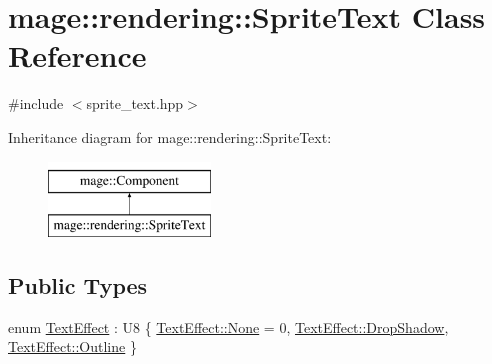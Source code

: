\hypertarget{classmage_1_1rendering_1_1_sprite_text}{}\section{mage\+:\+:rendering\+:\+:Sprite\+Text Class Reference}
\label{classmage_1_1rendering_1_1_sprite_text}


{\ttfamily \#include $<$sprite\+\_\+text.\+hpp$>$}

Inheritance diagram for mage\+:\+:rendering\+:\+:Sprite\+Text\+:\begin{figure}[H]
\begin{center}
\leavevmode
\includegraphics[height=2.000000cm]{classmage_1_1rendering_1_1_sprite_text}
\end{center}
\end{figure}
\subsection*{Public Types}
\begin{DoxyCompactItemize}
\item 
enum \mbox{\hyperlink{classmage_1_1rendering_1_1_sprite_text_af07ecf28d2ab8997c011cab74e799ef7}{Text\+Effect}} \+: U8 \{ \mbox{\hyperlink{classmage_1_1rendering_1_1_sprite_text_af07ecf28d2ab8997c011cab74e799ef7a6adf97f83acf6453d4a6a4b1070f3754}{Text\+Effect\+::\+None}} = 0, 
\mbox{\hyperlink{classmage_1_1rendering_1_1_sprite_text_af07ecf28d2ab8997c011cab74e799ef7a62fb0c043d7459d6590e00540884ea62}{Text\+Effect\+::\+Drop\+Shadow}}, 
\mbox{\hyperlink{classmage_1_1rendering_1_1_sprite_text_af07ecf28d2ab8997c011cab74e799ef7a606b51cc1c9d0b4af394419a22f2ff1f}{Text\+Effect\+::\+Outline}}
 \}
\end{DoxyCompactItemize}
